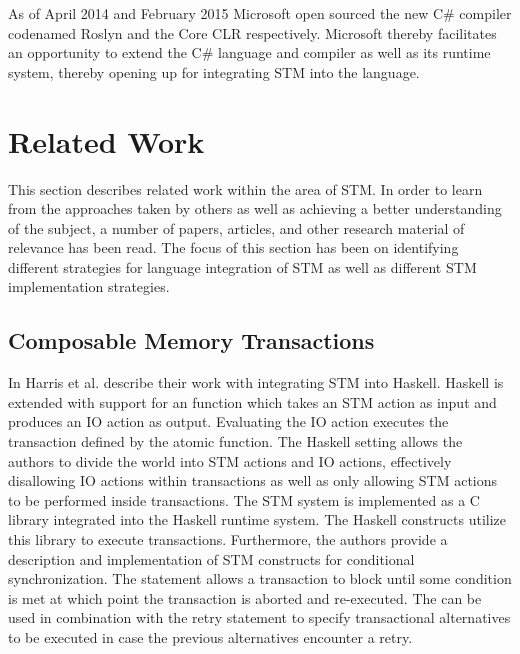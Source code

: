 As of April 2014  and February 2015 Microsoft open sourced the new C\# compiler\cite{roslyn} codenamed Roslyn and the Core \ac{CLR} \cite{coreclr} respectively. Microsoft thereby facilitates an opportunity to extend the C\# language and compiler as well as its runtime system, thereby opening up for integrating \ac{STM} into the language.
\section{Related Work}
\label{sec:intro_related_work}
This section describes related work within the area of \ac{STM}. In order to learn from the approaches taken by others as well as achieving a better understanding of the subject, a number of papers, articles, and other research material of relevance has been read. The focus of this section has been on identifying different strategies for language integration of \ac{STM} as well as different \ac{STM} implementation strategies.

\subsection{Composable Memory Transactions}
In \cite{harris2005composable} Harris et al. describe their work with integrating \ac{STM} into Haskell. Haskell is extended with support for an  function which takes an \ac{STM} action as input and produces an \ac{IO} action as output\cite[p. 51]{harris2005composable}. Evaluating the IO action executes the transaction defined by the atomic function. The Haskell setting allows the authors to divide the world into \ac{STM} actions and \ac{IO} actions\cite[p. 51]{harris2005composable}, effectively disallowing \ac{IO} actions within transactions as well as only allowing \ac{STM} actions to be performed inside transactions. The \ac{STM} system is implemented as a C library integrated into the Haskell runtime system. The Haskell constructs utilize this library to execute transactions\cite[p. 56]{harris2005composable}. Furthermore, the authors provide a description and implementation of \ac{STM} constructs for conditional synchronization. The  statement allows a transaction to block until some condition is met at which point the transaction is aborted and re-executed\cite[p. 52]{harris2005composable}. The  can be used in combination with the retry statement to specify transactional alternatives to be executed in case the previous alternatives encounter a retry\cite[p. 52]{harris2005composable}.

